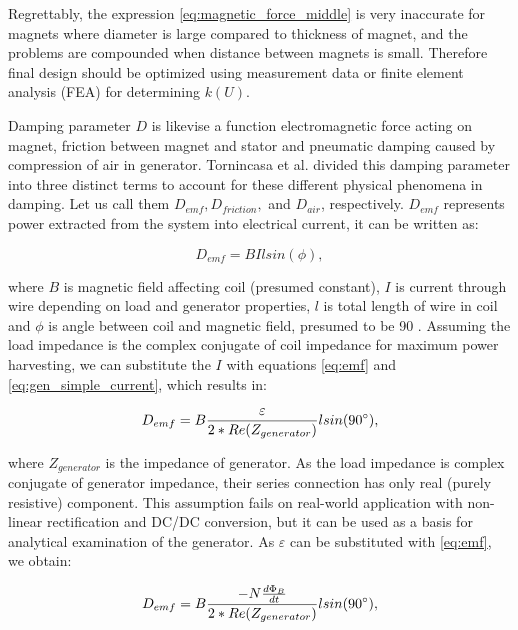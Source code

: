 Regrettably, the expression \eqref{eq:magnetic_force_middle} is very inaccurate for magnets where diameter is large compared to thickness of magnet, and the problems are compounded when distance between magnets is small. Therefore final design should be optimized using measurement data or finite element analysis (FEA) for determining $k(U)$. 

Damping parameter $D$ is likevise a function electromagnetic force acting on magnet, friction between magnet and stator and pneumatic damping caused by compression of air in generator. Tornincasa et al. \cite{Tornincasa2012} divided this damping parameter into three distinct terms to account for these different physical phenomena in damping. Let us call them $D_{emf}, D_{friction},$ and $D_{air}$, respectively. $D_{emf}$ represents power extracted from the system into electrical current, it can be written as:

\begin{equation}\label{eq:d_emd}
  D_{emf} = BIlsin(\phi),
\end{equation}

where $B$ is magnetic field affecting coil (presumed constant), $I$ is current through wire depending on load and generator properties, $l$ is total length of wire in coil and $\phi$ is angle between coil and magnetic field, presumed to be 90 \degree. Assuming the load impedance is the complex conjugate of coil impedance for maximum power harvesting, we can substitute the $I$ with equations \eqref{eq:emf} and \eqref{eq:gen_simple_current}, which results in: 

\begin{equation}
  D_{emf} = B \frac{\varepsilon}{2*Re(Z_{generator})} l sin(90 \degree),
\end{equation}

where $Z_{generator}$ is the impedance of generator. As the load impedance is complex conjugate of generator impedance, their series connection has only real (purely resistive) component. This assumption fails on real-world application with non-linear rectification and DC/DC conversion, but it can be used as a basis for analytical examination of the generator. As $\varepsilon$ can be substituted with \eqref{eq:emf}, we obtain:

\begin{equation}\label{eq:d_emf_with_epsilon}
  D_{emf} = B \frac{-N \frac{d \Phi_{B}}{d t}}{2*Re(Z_{generator})} l sin(90 \degree),
\end{equation}

